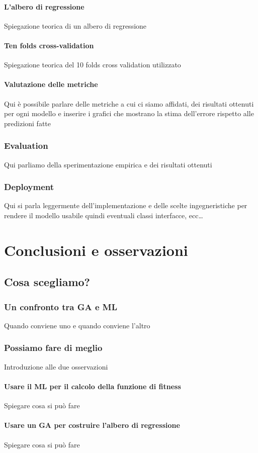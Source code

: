 \documentclass[a4paper, 11pt, oneside]{report}
\begin{document}
                \subsection{L'albero di regressione}
                Spiegazione teorica di un albero di regressione
                \subsection{Ten folds cross-validation}
                Spiegazione teorica del 10 folds cross validation utilizzato
                \subsection{Valutazione delle metriche}
                Qui è possibile parlare delle metriche a cui ci siamo affidati, dei risultati ottenuti per ogni modello
                e inserire i grafici che mostrano la stima dell'errore rispetto alle predizioni fatte

            \section{Evaluation}
            Qui parliamo della sperimentazione empirica e dei risultati ottenuti

            \section{Deployment}
            Qui si parla leggermente dell'implementazione e delle scelte ingegneristiche per rendere il modello usabile
            quindi eventuali classi interfacce, ecc\ldots


            \part{Conclusioni e osservazioni}
            \chapter{Cosa scegliamo?}
                \section{Un confronto tra GA e ML}
                Quando conviene uno e quando conviene l'altro
                \section{Possiamo fare di meglio}
                Introduzione alle due osservazioni
                    \subsection{Usare il ML per il calcolo della funzione di fitness}
                    Spiegare cosa si può fare
                    \subsection{Usare un GA per costruire l'albero di regressione}
                    Spiegare cosa si può fare
\end{document}
